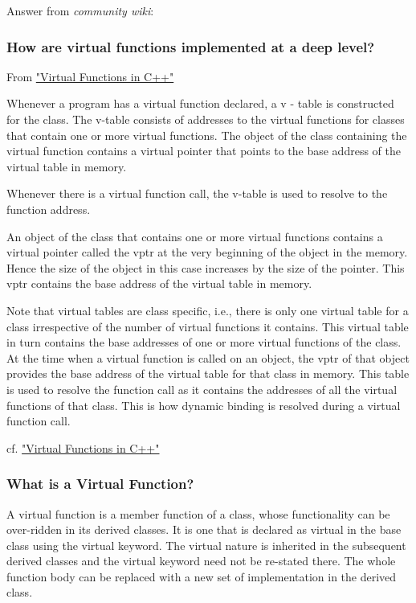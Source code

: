 \documentclass[10pt]{amsart}
\begin{document}
\begin{multicols*}{2}
Answer from \emph{community wiki}:  

\subsubsection{How are virtual functions implemented at a deep level?}

From \href{http://wayback.archive.org/web/20100209040010/http://www.codersource.net/published/view/325/virtual_functions_in.aspx}{"Virtual Functions in C++"}

Whenever a program has a virtual function declared, a v - table is constructed for the class. The v-table consists of addresses to the virtual functions for classes that contain one or more virtual functions. The object of the class containing the virtual function contains a virtual pointer that points to the base address of the virtual table in memory.  

Whenever there is a virtual function call, the v-table is used to resolve to the function address.  

An object of the class that contains one or more virtual functions contains a virtual pointer called the vptr at the very beginning of the object in the memory. Hence the size of the object in this case increases by the size of the pointer. This vptr contains the base address of the virtual table in memory.  

Note that virtual tables are class specific, i.e., there is only one virtual table for a class irrespective of the number of virtual functions it contains. This virtual table in turn contains the base addresses of one or more virtual functions of the class. At the time when a virtual function is called on an object, the vptr of that object provides the base address of the virtual table for that class in memory. This table is used to resolve the function call as it contains the addresses of all the virtual functions of that class. This is how dynamic binding is resolved during a virtual function call.

cf. \href{http://wayback.archive.org/web/20100209040010/http://www.codersource.net/published/view/325/virtual_functions_in.aspx}{"Virtual Functions in C++"}

\subsubsection{What is a Virtual Function?}  

A virtual function is a member function of a class, whose functionality can be over-ridden in its derived classes. It is one that is declared as virtual in the base class using the virtual keyword. The virtual nature is inherited in the subsequent derived classes and the virtual keyword need not be re-stated there. The whole function body can be replaced with a new set of implementation in the derived class. 


\end{multicols*}
\end{document}
